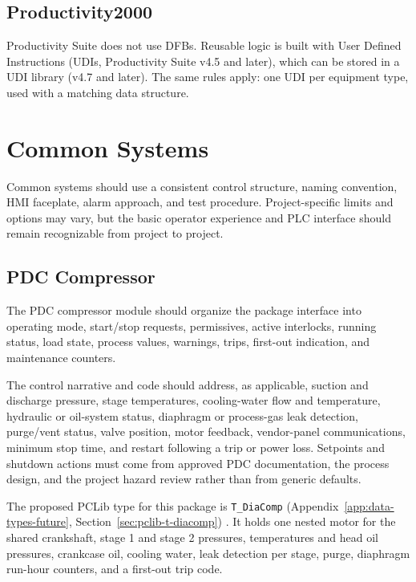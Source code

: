 \subsection{Productivity2000}
Productivity Suite does not use DFBs. Reusable logic is built with User Defined Instructions (UDIs, Productivity Suite v4.5 and later), which can be stored in a UDI library (v4.7 and later). The same rules apply: one UDI per equipment type, used with a matching data structure.

\section{Common Systems}
Common systems should use a consistent control structure, naming convention, HMI faceplate, alarm approach, and test procedure. Project-specific limits and options may vary, but the basic operator experience and PLC interface should remain recognizable from project to project.

\subsection{PDC Compressor}\label{sec:pdc-compressor}
The PDC compressor module should organize the package interface into operating mode, start/stop requests, permissives, active interlocks, running status, load state, process values, warnings, trips, first-out indication, and maintenance counters.

The control narrative and code should address, as applicable, suction and discharge pressure, stage temperatures, cooling-water flow and temperature, hydraulic or oil-system status, diaphragm or process-gas leak detection, purge/vent status, valve position, motor feedback, vendor-panel communications, minimum stop time, and restart following a trip or power loss. Setpoints and shutdown actions must come from approved PDC documentation, the process design, and the project hazard review rather than from generic defaults.

The proposed PCLib type for this package is \texttt{T\_DiaComp} (Appendix~\ref{app:data-types-future}, Section~\ref{sec:pclib-t-diacomp}) \newmark. It holds one nested motor for the shared crankshaft, stage 1 and stage 2 pressures, temperatures and head oil pressures, crankcase oil, cooling water, leak detection per stage, purge, diaphragm run-hour counters, and a first-out trip code.
